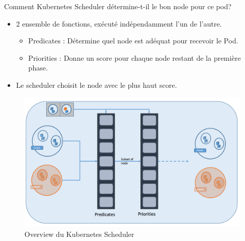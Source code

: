 \documentclass{bredelebeamer}
\begin{document}
\begin{frame}{Comment Kubernetes Scheduler détermine-t-il le bon node pour ce pod?}
\begin{itemize}
\item 2 ensemble de fonctions, exécuté indépendamment l'un de l'autre.
\begin{itemize}
\item Predicates : Détermine quel node est adéquat pour recevoir le Pod.
\item Priorities : Donne un score pour chaque node restant de la première phase.
\end{itemize}
\item Le scheduler choisit le node avec le plus haut score.
\end{itemize}

\begin{figure}
\centering
\includegraphics[scale=0.3]{images/img26.png}
\caption{Overview du Kubernetes Scheduler}
\end{figure}
\end{frame}
\end{document}
